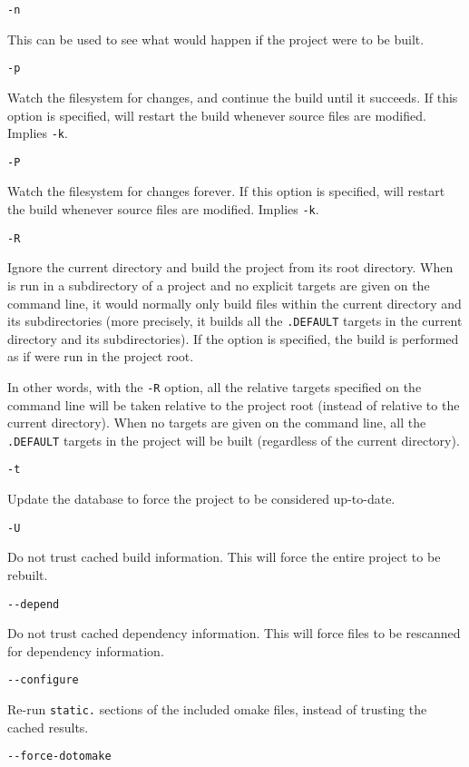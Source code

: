  \verb+-n+

This can be used to see what would happen if the project were to be built.

 \verb+-p+

Watch the filesystem for changes, and continue the build until it succeeds.  If this
option is specified,  will restart the build whenever source files are modified. Implies
\texttt{-k}.

 \verb+-P+

Watch the filesystem for changes forever.  If this option is specified, 
will restart the build whenever source files are modified. Implies
\texttt{-k}.

 \verb+-R+

Ignore the current directory and build the project from its root directory.  When  is
run in a subdirectory of a project and no explicit targets are given on the command line, it would
normally only build files within the current directory and its subdirectories (more precisely, it
builds all the \verb+.DEFAULT+ targets in the current directory and its subdirectories).  If the
 option is specified, the build is performed as if  were run in the project
root.

In other words, with the \verb+-R+ option, all the relative targets specified on the command line
will be taken relative to the project root (instead of relative to the current directory). When no
targets are given on the command line, all the \verb+.DEFAULT+ targets in the project will be built
(regardless of the current directory).

 \verb+-t+

Update the  database to force the project to be considered up-to-date.

 \verb+-U+

Do not trust cached build information.  This will force the entire project to be rebuilt.

 \verb+--depend+

Do not trust cached dependency information.  This will force files to be rescanned
for dependency information.

 \verb+--configure+

Re-run \verb+static.+ sections of the included omake files, instead of
trusting the cached results.

 \verb+--force-dotomake+

